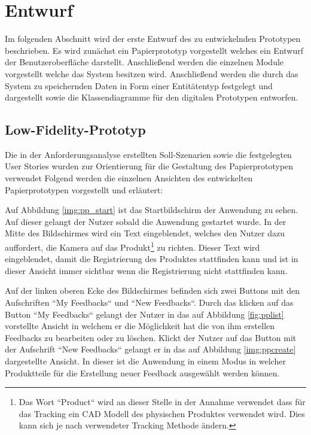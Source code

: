 \section{Entwurf}\label{entwurf}

Im folgenden Abschnitt wird der erste Entwurf des zu entwickelnden Prototypen beschrieben. Es wird zunächst ein Papierprototyp vorgestellt welches ein Entwurf der Benutzeroberfläche darstellt. 
Anschließend werden die einzelnen Module vorgestellt welche das System besitzen wird. Anschließend werden die durch das System zu speichernden Daten in Form einer Entitätentyp festgelegt und dargestellt
sowie die Klassendiagramme für den digitalen Prototypen entworfen.  

\subsection{Low-Fidelity-Prototyp}\label{lowfi}

Die in der Anforderungsanalyse erstellten Soll-Szenarien sowie die festgelegten User Stories wurden zur Orientierung für die Gestaltung des Papierprototypen verwendet
Folgend werden die einzelnen Ansichten des entwickelten Papierprototypen vorgestellt und erläutert: 

Auf Abbildung \ref{img:pp_start} ist das Startbildschirm der Anwendung zu sehen. Auf dieser gelangt der Nutzer sobald die Anwendung gestartet wurde. 
In der Mitte des Bildschirmes wird ein Text eingeblendet, welches den Nutzer dazu auffordert, die Kamera auf das Produkt\footnote{Das Wort ``Product`` wird an dieser Stelle in der Annahme verwendet dass für das Tracking ein CAD Modell des physischen Produktes verwendet wird. Dies kann sich je nach verwendeter Tracking Methode ändern.} zu richten. Dieser Text wird eingeblendet, damit die Registrierung des Produktes stattfinden kann und ist in dieser Ansicht immer sichtbar wenn die Registrierung nicht stattfinden kann.

Auf der linken oberen Ecke des Bildschirmes befinden sich zwei Buttons mit den Aufschriften ``My Feedbacks`` und ``New Feedbacks``. Durch das klicken auf das Button ``My Feedbacks`` gelangt der Nutzer in 
das auf Abbildung \ref{fig:pplist} vorstellte Ansicht in welchem er die Möglichkeit hat die von ihm erstellen Feedbacks zu bearbeiten oder zu löschen. Klickt der Nutzer auf das Button mit der Aufschrift 
``New Feedbacks`` gelangt er in das auf Abbildung \ref{img:ppcreate} dargestellte Ansicht. In dieser ist die Anwendung in einem Modus in welcher Produktteile für die Erstellung neuer Feedback ausgewählt werden können. 


